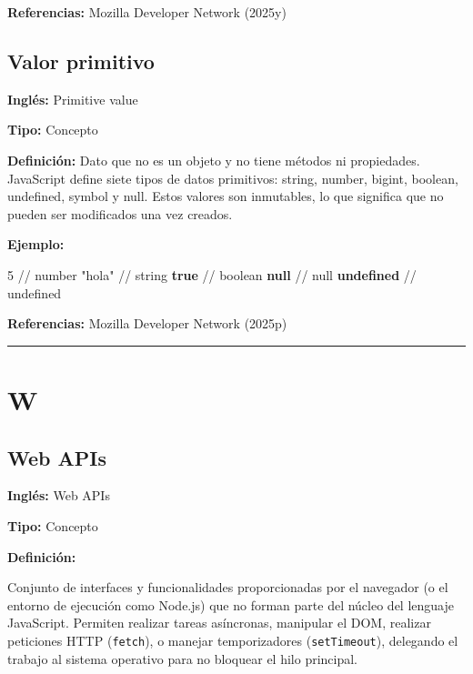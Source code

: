 \documentclass[
  letterpaper,
  DIV=11,
  numbers=noendperiod]{scrreprt}
\newenvironment{Shaded}{\begin{snugshade}}{\end{snugshade}}
\newcommand{\CommentTok}[1]{\textcolor[rgb]{0.37,0.37,0.37}{#1}}
\newcommand{\DecValTok}[1]{\textcolor[rgb]{0.68,0.00,0.00}{#1}}
\newcommand{\KeywordTok}[1]{\textcolor[rgb]{0.00,0.23,0.31}{\textbf{#1}}}
\newcommand{\StringTok}[1]{\textcolor[rgb]{0.13,0.47,0.30}{#1}}
\let\oldsubsection\subsection
\renewcommand{\subsection}{\phantomsection\oldsubsection}
\begin{document}
\textbf{Referencias:} Mozilla Developer Network (2025y)

\subsection*{Valor primitivo}\label{glos-primitivo}

\textbf{Inglés:} Primitive value

\textbf{Tipo:} Concepto

\textbf{Definición:} Dato que no es un objeto y no tiene métodos ni
propiedades. JavaScript define siete tipos de datos primitivos: string,
number, bigint, boolean, undefined, symbol y null. Estos valores son
inmutables, lo que significa que no pueden ser modificados una vez
creados.

\textbf{Ejemplo:}

\begin{Shaded}
\begin{Highlighting}[]
\DecValTok{5} \CommentTok{// number}
\StringTok{"hola"} \CommentTok{// string}
\KeywordTok{true} \CommentTok{// boolean}
\KeywordTok{null} \CommentTok{// null}
\KeywordTok{undefined} \CommentTok{// undefined}
\end{Highlighting}
\end{Shaded}

\textbf{Referencias:} Mozilla Developer Network (2025p)

\begin{center}\rule{0.5\linewidth}{0.5pt}\end{center}

\section*{W}\label{w}


\subsection*{Web APIs}\label{glos-web_apis}

\textbf{Inglés:} Web APIs

\textbf{Tipo:} Concepto

\textbf{Definición:}

Conjunto de interfaces y funcionalidades proporcionadas por el navegador
(o el entorno de ejecución como Node.js) que no forman parte del núcleo
del lenguaje JavaScript. Permiten realizar tareas asíncronas, manipular
el DOM, realizar peticiones HTTP (\texttt{fetch}), o manejar
temporizadores (\texttt{setTimeout}), delegando el trabajo al sistema
operativo para no bloquear el hilo principal.
\end{document}
